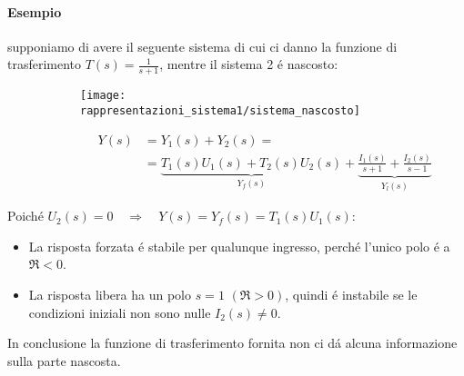 \documentclass[../main.tex]{subfiles}
\begin{document}
		\begin{mdframed}[style=Esempio]
			\paragraph{Esempio} 
			supponiamo di avere il seguente sistema di cui ci danno la funzione di trasferimento $ T(s) = \frac{1}{s+1} $, mentre il sistema 2 \'e nascosto:
			\begin{figure}[H]
				\begin{subfigure}{0.4\textwidth}
					\texttt{[image: rappresentazioni\_sistema1/sistema\_nascosto]}
				\end{subfigure}
				\begin{subfigure}{0.5\textwidth}
					\begin{align*}
						\quad Y(s) &= Y_1(s) + Y_2(s) =
						\\
						&= \underbrace{T_1(s)U_1(s) + T_2(s)U_2(s)}_{Y_f(s)} + \underbrace{\frac{I_1(s)}{s+1} + \frac{I_2(s)}{s-1}}_{Y_l(s)}
					\end{align*}
				\end{subfigure}
			\end{figure}
			Poich\'e $ U_2(s) = 0 \quad \Rightarrow \quad Y(s) = Y_f(s) = T_1(s)U_1(s)$:
			\begin{itemize}
				\item
					La risposta forzata \'e stabile per qualunque ingresso, perch\'e l'unico polo \'e a $ \Re < 0 $.
				\item
					La risposta libera ha un polo $ s = 1 $ $ (\Re > 0) $, quindi \'e instabile se le condizioni iniziali non sono nulle $ I_2(s) \neq 0 $.
			\end{itemize}
			In conclusione la funzione di trasferimento fornita non ci d\'a alcuna informazione sulla parte nascosta.
		\end{mdframed}
\end{document}

